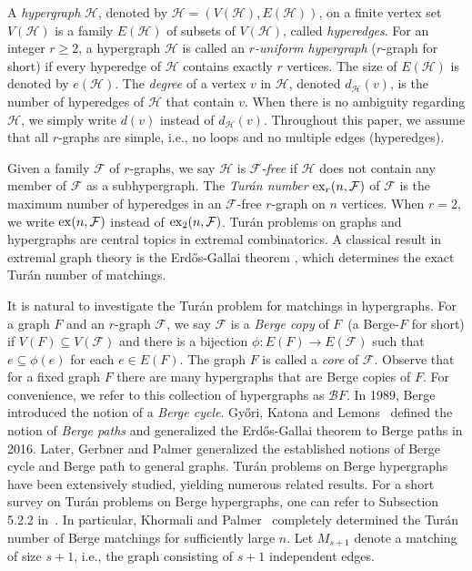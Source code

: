 \documentclass[11pt]{article}
\numberwithin{equation}{section}
\newcommand\cF{{\mathcal F}}
\newcommand\cH{{\mathcal H}}
\begin{document}
A \textit{hypergraph} $\cH$, denoted by $\cH=(V(\cH),E(\cH))$, on a finite vertex set $V(\cH)$ is a family $E(\mathcal{H})$ of subsets of $V(\cH)$, called \textit{hyperedges}.
For an integer $r\geq2$, a hypergraph $\cH$ is called an \textit{$r$-uniform hypergraph} ($r$-graph for short) if every hyperedge of $\cH$ contains exactly $r$ vertices. %
The size of $E(\cH)$ is denoted by $e(\cH)$. The \textit{degree} of a vertex $v$ in $\cH$, denoted $d_{\cH}(v)$, is the number of hyperedges of $\cH$ that contain $v$.
When there is no ambiguity regarding $\cH$, we simply write $d(v)$ instead of $d_\cH(v)$.
Throughout this paper, %
we assume that all $r$-graphs are simple, i.e., no loops and no multiple edges (hyperedges).

Given a family $\cF$ of $r$-graphs, we say $\cH$ is \textit{$\cF$-free} if $\cH$ does not contain any member of $\cF$ as a subhypergraph. The \textit{Tur\'{a}n number} ${\rm{ex}}_r(n,\cF)$ of $\cF$ is the maximum number of hyperedges in an $\cF$-free $r$-graph on $n$ vertices. When $r=2$, we write ${\rm{ex}}(n,\cF)$ instead of ${\rm{ex}}_2(n,\cF)$.
Tur\'{a}n problems on graphs and hypergraphs are central topics in extremal combinatorics. A classical result in extremal graph theory is the Erd\H{o}s-Gallai theorem \cite{gallai1959maximal}, which determines the exact Tur\'{a}n number of matchings. 

It is natural to investigate the Tur\'{a}n problem for matchings in hypergraphs. For a graph $F$ and an $r$-graph $\cF$, we say $\cF$ is a \textit{Berge copy} of $F$~(a Berge-$F$ for short) if $V(F) \subseteq V(\cF)$ and there is a bijection $\phi: E(F) \rightarrow E(\cF)$ such that $e \subseteq \phi(e)$ for each $e \in E(F)$. The graph $F$ is called a \textit{core} of $\cF$. Observe that for a fixed graph $F$ there are many hypergraphs that are Berge copies of $F$. For convenience, we refer to this collection of hypergraphs as $\mathcal{B}F$. 
In 1989, Berge~\cite{berge1984hypergraphs} introduced the notion of a \textit{Berge cycle}. Gy\H{o}ri, Katona and Lemons~\cite{GYORI2016238} defined the notion of \textit{Berge paths} and generalized the Erd\H{o}s-Gallai theorem to Berge paths in 2016. Later, Gerbner and Palmer \cite{gerbner2017extremal} generalized the established notions of Berge cycle and Berge path to general graphs.
Tur\'{a}n problems on Berge hypergraphs have been extensively studied, yielding numerous related results.
For a short survey on Tur\'{a}n problems on Berge hypergraphs, one can refer to Subsection 5.2.2 in~\cite{gerbner2018extremal}. 
In particular, Khormali and Palmer~\cite{KHORMALI2022103506} completely determined the Tur\'{a}n number of Berge matchings for sufficiently large $n$.
Let $M_{s+1}$ denote a matching of size $s+1$, i.e., the graph consisting of $s+1$ independent edges. 
\end{document}
